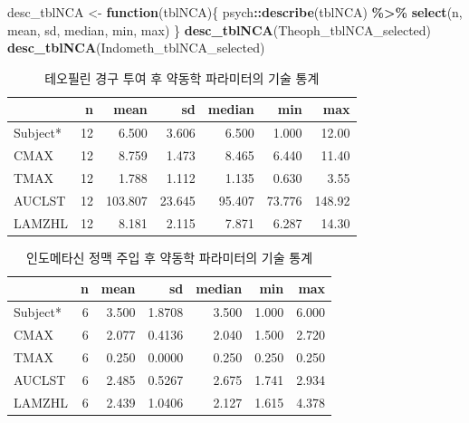 \documentclass[
  11pt,
  krantz2, a4paper, twoside]{krantz}
\newenvironment{Shaded}{\begin{snugshade}}{\end{snugshade}}
\newcommand{\ControlFlowTok}[1]{\textcolor[rgb]{0.13,0.29,0.53}{\textbf{#1}}}
\newcommand{\FunctionTok}[1]{\textcolor[rgb]{0.13,0.29,0.53}{\textbf{#1}}}
\newcommand{\NormalTok}[1]{#1}
\newcommand{\OtherTok}[1]{\textcolor[rgb]{0.56,0.35,0.01}{#1}}
\newcommand{\SpecialCharTok}[1]{\textcolor[rgb]{0.81,0.36,0.00}{\textbf{#1}}}
\theoremstyle{definition}
\theoremstyle{definition}
\theoremstyle{definition}
\theoremstyle{definition}
\theoremstyle{remark}
\begin{document}
\vspace{-5ex}

\begin{Shaded}
\begin{Highlighting}[]
\NormalTok{desc\_tblNCA }\OtherTok{\textless{}{-}} \ControlFlowTok{function}\NormalTok{(tblNCA)\{}
\NormalTok{  psych}\SpecialCharTok{::}\FunctionTok{describe}\NormalTok{(tblNCA) }\SpecialCharTok{\%\textgreater{}\%}
    \FunctionTok{select}\NormalTok{(n, mean, sd, median, min, max)}
\NormalTok{\}}
\FunctionTok{desc\_tblNCA}\NormalTok{(Theoph\_tblNCA\_selected)}
\FunctionTok{desc\_tblNCA}\NormalTok{(Indometh\_tblNCA\_selected)}
\end{Highlighting}
\end{Shaded}

\begin{table}

\caption{\label{tab:theodesc}테오필린 경구 투여 후 약동학 파라미터의 기술 통계}
\centering
\begin{tabular}[t]{lrrrrrr}
\toprule
  & n & mean & sd & median & min & max\\
\midrule
Subject* & 12 & 6.500 & 3.606 & 6.500 & 1.000 & 12.00\\
CMAX & 12 & 8.759 & 1.473 & 8.465 & 6.440 & 11.40\\
TMAX & 12 & 1.788 & 1.112 & 1.135 & 0.630 & 3.55\\
AUCLST & 12 & 103.807 & 23.645 & 95.407 & 73.776 & 148.92\\
LAMZHL & 12 & 8.181 & 2.115 & 7.871 & 6.287 & 14.30\\
\bottomrule
\end{tabular}
\end{table}

\begin{table}

\caption{\label{tab:indodesc}인도메타신 정맥 주입 후 약동학 파라미터의 기술 통계}
\centering
\begin{tabular}[t]{lrrrrrr}
\toprule
  & n & mean & sd & median & min & max\\
\midrule
Subject* & 6 & 3.500 & 1.8708 & 3.500 & 1.000 & 6.000\\
CMAX & 6 & 2.077 & 0.4136 & 2.040 & 1.500 & 2.720\\
TMAX & 6 & 0.250 & 0.0000 & 0.250 & 0.250 & 0.250\\
AUCLST & 6 & 2.485 & 0.5267 & 2.675 & 1.741 & 2.934\\
LAMZHL & 6 & 2.439 & 1.0406 & 2.127 & 1.615 & 4.378\\
\bottomrule
\end{tabular}
\end{table}
\end{document}
